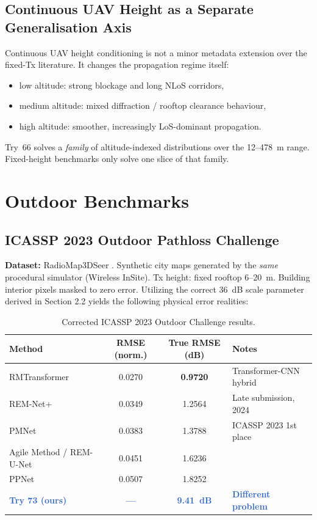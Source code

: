 \documentclass[11pt,a4paper]{article}
\newcommand{\better}[1]{\textcolor{good}{\textbf{#1}}}
\newcommand{\ours}[1]{\textcolor{highlight}{\textbf{#1}}}
\begin{document}
\subsection{Continuous UAV Height as a Separate Generalisation Axis}

Continuous UAV height conditioning is not a minor metadata extension over the
fixed-Tx literature. It changes the propagation regime itself:
\begin{itemize}[nosep]
    \item low altitude: strong blockage and long NLoS corridors,
    \item medium altitude: mixed diffraction / rooftop clearance behaviour,
    \item high altitude: smoother, increasingly LoS-dominant propagation.
\end{itemize}
Try~66 solves a \emph{family} of altitude-indexed distributions over the 12--478~m range.
Fixed-height benchmarks only solve one slice of that family.

\section{Outdoor Benchmarks}
\label{sec:outdoor}

\subsection{ICASSP 2023 Outdoor Pathloss Challenge}
\label{ssec:icassp2023}

\textbf{Dataset:} RadioMap3DSeer \cite{icassp2023challenge}. Synthetic city maps generated by the \emph{same} procedural simulator (Wireless InSite). Tx height: fixed rooftop 6--20~m. Building interior pixels masked to zero error. Utilizing the correct 36~dB scale parameter derived in Section 2.2 yields the following physical error realities:

\begin{table}[h!]
\centering
\caption{Corrected ICASSP 2023 Outdoor Challenge results.}
\label{tab:icassp2023}
\small
\begin{tabular}{lccl}
\toprule
\textbf{Method} & \textbf{RMSE (norm.)} & \textbf{True RMSE (dB)} & \textbf{Notes} \\
\midrule
RMTransformer \cite{rmtransformer2025} & 0.0270 & \better{0.9720} & Transformer-CNN hybrid \\
REM-Net+ \cite{remnet2024} & 0.0349 & 1.2564 & Late submission, 2024 \\
PMNet \cite{pmnet2023} & 0.0383 & 1.3788 & ICASSP 2023 1st place \\
Agile Method / REM-U-Net & 0.0451 & 1.6236 & \\
PPNet & 0.0507 & 1.8252 & \\
\midrule
\ours{Try 73 (ours)} & \ours{---} & \ours{9.41~dB} & \ours{Different problem} \\
\bottomrule
\end{tabular}
\end{table}
\normalsize
\end{document}

